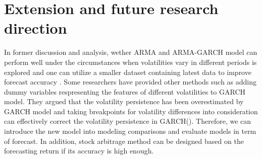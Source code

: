 \documentclass [letterpaper] {article}
\begin{document}
 \section{Extension and future research direction}
In former discussion and analysis, wether ARMA and ARMA-GARCH model can perform well under the circumstances when volatilities vary in different periods is explored and one can utilize a smaller dataset containing latest data to improve forecast accuracy . Some researchers have provided other methods such as 
adding dummy variables respresenting the features of different volatilities to GARCH model. They argued that the volatility persistence has been overestimated by GARCH model and taking breakpoints for volatility differences into consideration can effectively correct the volatility persistence in GARCH(\cite{num1}). Therefore, we can introduce the new model into modeling comparisons and evaluate models in term of forecast. In addition, stock arbitrage method can be designed based on the forecasting return if its accuracy  is high enough.



\end{document}
